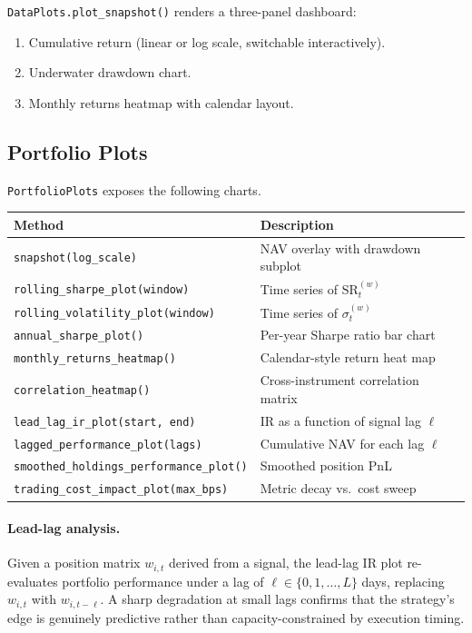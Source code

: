 \documentclass[11pt,a4paper]{article}
\begin{document}
\texttt{DataPlots.plot\_snapshot()} renders a three-panel dashboard:
\begin{enumerate}
  \item Cumulative return (linear or log scale, switchable interactively).
  \item Underwater drawdown chart.
  \item Monthly returns heatmap with calendar layout.
\end{enumerate}

\subsection{Portfolio Plots}

\texttt{PortfolioPlots} exposes the following charts.

\begin{center}
\begin{tabular}{@{}ll@{}}
\toprule
Method & Description \\
\midrule
\texttt{snapshot(log\_scale)} & NAV overlay with drawdown subplot \\
\texttt{rolling\_sharpe\_plot(window)} & Time series of $\mathrm{SR}_t^{(w)}$ \\
\texttt{rolling\_volatility\_plot(window)} & Time series of $\sigma_t^{(w)}$ \\
\texttt{annual\_sharpe\_plot()} & Per-year Sharpe ratio bar chart \\
\texttt{monthly\_returns\_heatmap()} & Calendar-style return heat map \\
\texttt{correlation\_heatmap()} & Cross-instrument correlation matrix \\
\texttt{lead\_lag\_ir\_plot(start, end)} & IR as a function of signal lag $\ell$ \\
\texttt{lagged\_performance\_plot(lags)} & Cumulative NAV for each lag $\ell$ \\
\texttt{smoothed\_holdings\_performance\_plot()} & Smoothed position PnL \\
\texttt{trading\_cost\_impact\_plot(max\_bps)} & Metric decay vs.\ cost sweep \\
\bottomrule
\end{tabular}
\end{center}

\paragraph{Lead-lag analysis.}
Given a position matrix $w_{i,t}$ derived from a signal, the lead-lag IR plot
re-evaluates portfolio performance under a lag of $\ell \in \{0,1,\ldots,L\}$
days, replacing $w_{i,t}$ with $w_{i,t-\ell}$.  A sharp degradation at small
lags confirms that the strategy's edge is genuinely predictive rather than
capacity-constrained by execution timing.
\end{document}
